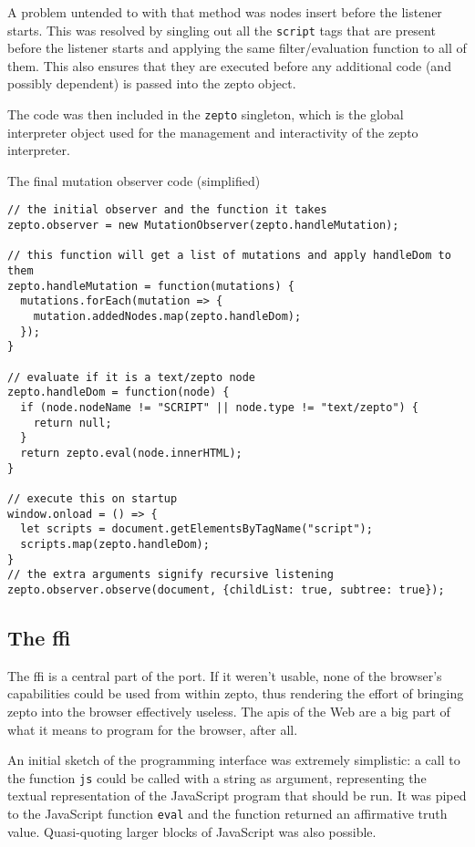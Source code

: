 \documentclass[oneside,11pt,xetex]{scrbook}
\begin{document}
A problem untended to with that method was nodes insert before the listener starts. This was resolved by
singling out all the \texttt{script} tags that are present before the listener starts and applying the
same filter/evaluation function to all of them. This also ensures that they are executed before any
additional code (and possibly dependent) is passed into the zepto object.

The code was then included in the \texttt{zepto} singleton, which is the global interpreter object
used for the management and interactivity of the zepto interpreter.

\begin{listing}[H]
\caption{The final mutation observer code (simplified)}
\begin{verbatim}
// the initial observer and the function it takes
zepto.observer = new MutationObserver(zepto.handleMutation);

// this function will get a list of mutations and apply handleDom to them
zepto.handleMutation = function(mutations) {
  mutations.forEach(mutation => {
    mutation.addedNodes.map(zepto.handleDom);
  });
}

// evaluate if it is a text/zepto node
zepto.handleDom = function(node) {
  if (node.nodeName != "SCRIPT" || node.type != "text/zepto") {
    return null;
  }
  return zepto.eval(node.innerHTML);
}

// execute this on startup
window.onload = () => {
  let scripts = document.getElementsByTagName("script");
  scripts.map(zepto.handleDom);
}
// the extra arguments signify recursive listening
zepto.observer.observe(document, {childList: true, subtree: true});
\end{verbatim}
\end{listing}

\subsection{The \gls{ffi}}

The \gls{ffi} is a central part of the port. If it weren't usable, none of the browser's
capabilities could be used from within zepto, thus rendering the effort of bringing zepto into
the browser effectively useless. The \gls{api}s of the Web are a big part of what it means to
program for the browser, after all.

An initial sketch of the programming interface was extremely simplistic: a call to the
function \texttt{js} could be called with a string as argument, representing the textual
representation of the JavaScript program that should be run. It was piped to the JavaScript
function \texttt{eval} and the function returned an affirmative truth value. Quasi-quoting
larger blocks of JavaScript was also possible.
\end{document}
